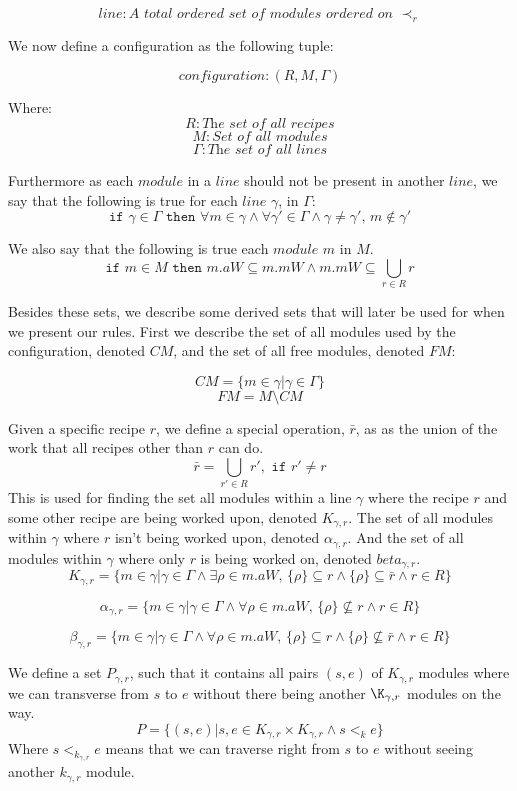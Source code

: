 \[line: \textit{A total ordered set of modules ordered on } \prec_r\]

We now define a configuration as the following tuple:

\[configuration: (R, M, \Gamma)\]

Where:
\[R: \textit{The set of all recipes}\]
\[M: \textit{Set of all modules}\]
\[\Gamma: \textit{The set of all lines}\]



Furthermore as each $module$ in a $line$ should not be present in another $line$, we say that the following is true for each $line$ $\gamma$, in $\Gamma$:
\[\texttt{if } \gamma \in \Gamma \texttt{ then } \forall m \in \gamma \land \forall \gamma ' \in \Gamma \land \gamma \neq \gamma ',\, m \notin \gamma ' \]

We also say that the following is true each $module$ $m$ in $M$.
\[\texttt{if } m \in M \texttt{ then } m.aW \subseteq m.mW \land m.mW \subseteq  \bigcup_{r\in R}r\] 


Besides these sets, we describe some derived sets that will later be used for when we present our rules. First we describe the set of all modules used by the configuration, denoted $CM$, and the set of all free modules, denoted $FM$:


\[CM = \{m \in \gamma | \gamma \in \Gamma \}\]
\[FM = M \setminus CM \]

Given a specific recipe $r$, we define a special operation, $\bar{r}$, as as the union of the work that all recipes other than $r$ can do. 
\[\bar{r} = \bigcup_{r' \in R}r', \texttt{ if } r' \neq r\]
This is used for finding the set all modules within a line $\gamma$ where the recipe $r$ and some other recipe are being worked upon, denoted $K_{\gamma ,r}$. The set of all modules within $\gamma$ where $r$ isn't being worked upon, denoted $\alpha_{\gamma ,r}$. And the set of all modules within $\gamma$ where only $r$ is being worked on, denoted $beta_{\gamma ,r}$. 
\[K_{\gamma ,r} = \{m \in \gamma | \gamma \in \Gamma \land \exists \rho \in m.aW,\, \{\rho\} \subseteq r \land \{\rho\} \subseteq \bar{r} \land r \in R\}\]

\[\alpha_{\gamma ,r}  = \{m \in \gamma | \gamma \in \Gamma \land \forall \rho \in m.aW,\, \{\rho\} \nsubseteq r \land r \in R\}\]

\[\beta_{\gamma ,r}  = \{m \in \gamma | \gamma \in \Gamma \land \forall \rho \in m.aW,\, \{\rho\} \subseteq r \land \{\rho\} \nsubseteq \bar{r} \land r \in R\}\]


We define a set $P_{\gamma ,r}$, such that it contains all pairs $(s, e)$ of $K_{\gamma ,r}$ modules where we can transverse from $s$ to $e$ without there being another $\K_{\gamma, r}$ modules on the way.
\[P = \{(s, e)| {s, e} \in K_{\gamma ,r} \times K_{\gamma ,r} \land s <_k  e\}\]
Where $s <_k_{\gamma ,r} e$ means that we can traverse right from $s$ to $e$ without seeing another $k_{\gamma, r}$ module. 

